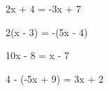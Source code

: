
\begin{pageenonces}
    \begin{tcolorbox}[carteenonce={1}]
        2x + 4 = -3x + 7
    \end{tcolorbox}
    \begin{tcolorbox}[carteenonce={2}]
        2(x - 3) = -(5x - 4)
    \end{tcolorbox}
    \begin{tcolorbox}[carteenonce={3}]
        10x - 8 = x - 7
    \end{tcolorbox}
    \begin{tcolorbox}[carteenonce={4}]
        4 - (-5x + 9) = 3x + 2
    \end{tcolorbox}
\end{pageenonces}

